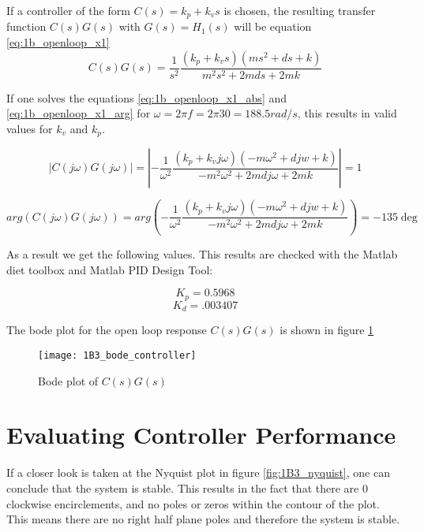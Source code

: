 \documentclass[report.tex]{subfiles}
\begin{document}
If a controller of the form $C(s)=k_p+k_vs$ is chosen, the resulting transfer function $C(s)G(s)$ with $G(s)=H_1(s)$ will be equation \ref{eq:1b_openloop_x1}
\begin{equation}
C(s)G(s) = \frac{1}{s^2}\frac{(k_p+k_vs)(ms^2+ds+k)}{m^2s^2+2mds+2mk}
\label{eq:1b_openloop_x1}
\end{equation}

If one solves the equations \ref{eq:1b_openloop_x1_abs} and \ref{eq:1b_openloop_x1_arg} for $\omega = 2\pi f = 2\pi30 = 188.5 rad/s$, this results in valid values for $k_v$ and $k_p$. 

\begin{equation}
|C(j\omega)G(j\omega)| = |-\frac{1}{\omega^2}\frac{(k_p+k_vj\omega)(-m\omega^2+djw+k)}{-m^2\omega^2+2mdj\omega+2mk}| = 1
\label{eq:1b_openloop_x1_abs}
\end{equation}

\begin{equation}
arg(C(j\omega)G(j\omega)) = arg(-\frac{1}{\omega^2}\frac{(k_p+k_vj\omega)(-m\omega^2+djw+k)}{-m^2\omega^2+2mdj\omega+2mk}) = -135\deg
\label{eq:1b_openloop_x1_arg}
\end{equation}

As a result we get the following values. This results are checked with the Matlab diet toolbox and Matlab PID Design Tool:

\begin{equation}
	K_p=0.5968
\end{equation}
\begin{equation}
	K_d=.003407
\end{equation}

The bode plot for the open loop response $C(s)G(s)$ is shown in figure \ref{fig:1B3_bode_controller}

\begin{figure}[H] 
	\texttt{[image: 1B3\_bode\_controller]}
	\centering
	\caption{Bode plot of $C(s)G(s)$}
	\label{fig:1B3_bode_controller}
\end{figure}

\section{Evaluating Controller Performance}
If a closer look is taken at the Nyquist plot in figure \ref{fig:1B3_nyquist}, one can conclude that the system is stable. This results in the fact that there are 0 clockwise encirclements, and no poles or zeros within the contour of the plot. This means there are no right half plane poles and therefore the system is stable. 
\end{document}

